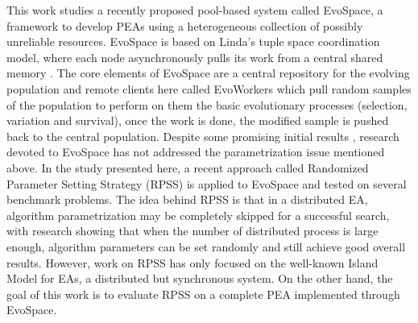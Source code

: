 \documentclass{sig-alternate}
\begin{document}
This work studies a recently proposed pool-based system called EvoSpace, a framework to develop PEAs using 
a heterogeneous collection of possibly unreliable resources.
EvoSpace is based on Linda's tuple space coordination model, where each node asynchronously
pulls its work from a central shared memory  \cite{Evospace,Musart,FreeLunch,Fire}. The core elements of EvoSpace are a central 
repository for the evolving population and remote clients here called EvoWorkers
which pull random samples of the population to perform on them the basic evolutionary
processes (selection, variation and survival), once the work is done, the
modified sample is pushed back to the central population.
Despite some promising initial results \cite{Evospace,Musart,FreeLunch,Fire}, research devoted to EvoSpace has not addressed the parametrization issue mentioned above.
In the study presented here, a recent approach called Randomized Parameter Setting Strategy (RPSS) \cite{fuku1,fuku2} is applied to EvoSpace and tested on several
benchmark problems.
The idea behind RPSS is that in a distributed EA, algorithm parametrization may be completely skipped for a successful search,
with research showing that when the number of distributed process is large enough, algorithm parameters can be set randomly and still achieve
good overall results.
However, work on RPSS has only focused on the well-known Island Model for EAs, a distributed but synchronous system.
On the other hand, the goal of this work is to evaluate RPSS on a complete PEA implemented through EvoSpace.


%
\end{document}
